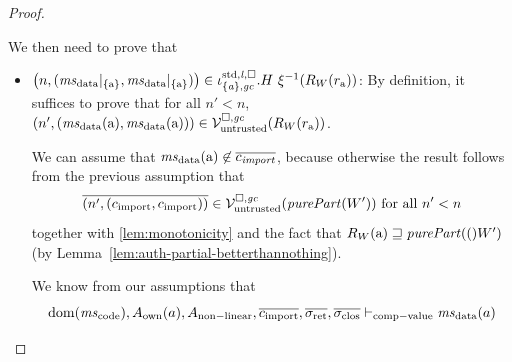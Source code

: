 \documentclass[a4paper]{article}
\begin{document}
\begin{proof}
\begin{itemize}
    We then need to prove that 
    \begin{itemize}
    \item $\npair{(\msdata|_{\{\addr\}},\msdata|_{\{\addr\}})} \in \stdreg{\{\aaddr\},\gc}{\lin}.H~ \xi^{-1}(R_W(r_\addr))$:
      By definition, it suffices to prove that for all $n' < n$,
      $\npair[n']{(\msdata(\addr),\msdata(\addr))} \in \lrv(R_W(r_\addr))$.

      We can assume that $\msdata(\addr) \not\in \overline{c_{\var{import}}}$, because otherwise the result follows from the previous assumption that 
      \begin{equation*}
        \overline{\npair[n']{(c_{\mathrm{import}},c_{\mathrm{import}})}} \in \lrv(\purePart{W'}) \text{ for all $n' < n$} 
      \end{equation*}
      together with \ref{lem:monotonicity} and the fact that $R_W(\addr) \future \purePart(W')$ (by Lemma~\ref{lem:auth-partial-betterthannothing}).

      We know from our assumptions that
      \begin{equation*}
        \dom(\mscode),A_{\mathrm{own}}(a),A_{\mathrm{non-linear}},\overline{c_{\mathrm{import}}},\sigrets,\sigcloss \vdash_{\mathrm{comp-value}} \msdata(a)
      \end{equation*}
      

\end{itemize}
\end{itemize}
\end{proof}
\end{document}
